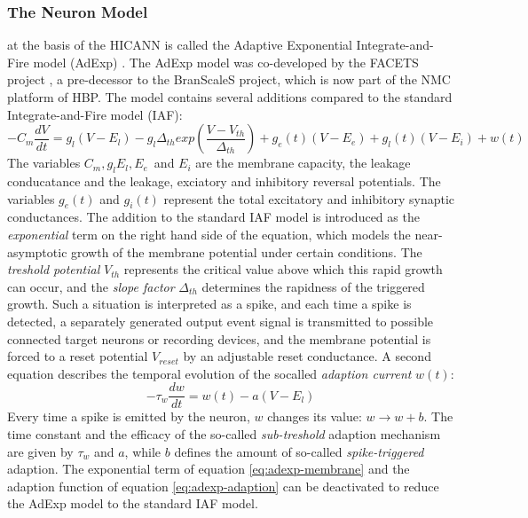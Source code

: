 \subsubsection{The Neuron Model}\label{sect:adexp} at the basis of the HICANN is called the Adaptive Exponential Integrate-and-Fire model (AdExp) \cite{brette_adaptive_2005}.
The AdExp model was co-developed by the FACETS project \cite{schemmel_wafer-scale_2010}, a pre-decessor to the BranScaleS project, which is now part of the NMC platform of HBP.
The model contains several additions compared to the standard Integrate-and-Fire model (IAF):
\begin{equation}\label{eq:adexp-membrane}
-C_m\frac{dV}{dt} = g_l(V-E_l) - g_l\Delta_{th}exp(\frac{V-V_{th}}{\Delta_{th}}) + g_e(t)(V-E_e)+g_l(t)(V-E_i)+w(t)
\end{equation}
The variables $C_m, g_l E_l, E_e$ and $E_i$ are the membrane capacity, the leakage conducatance and the leakage, exciatory and inhibitory reversal potentials.
The variables $g_e(t)$ and $g_i(t)$ represent the total excitatory and inhibitory synaptic conductances.
The addition to the standard IAF model is introduced as the \textit{exponential} term on the right hand side of the equation, which models the near-asymptotic growth of the membrane potential under certain conditions.
The \textit{treshold potential} $V_{th}$ represents the critical value above which this rapid growth can occur, and the \textit{slope factor} $\Delta_{th}$ determines the rapidness of the triggered growth.
Such a situation is interpreted as a spike, and each time a spike is detected, a separately generated output event signal is transmitted to possible connected target neurons or recording devices, and the membrane potential is forced to a reset potential $V_{reset}$ by an adjustable reset conductance.
A second equation describes the temporal evolution of the socalled \textit{adaption current} $w(t)$:
\begin{equation}\label{eq:adexp-adaption}
-\tau_{w}\frac{dw}{dt} = w(t) - a(V-E_l)
\end{equation}
Every time a spike is emitted by the neuron, $w$ changes its value: $w \rightarrow w + b$.
The time constant and the efficacy of the so-called \textit{sub-treshold} adaption mechanism are given by $\tau_w$ and $a$, while $b$ defines the amount of so-called \textit{spike-triggered} adaption.
The exponential term of equation \ref{eq:adexp-membrane} and the adaption function of equation \ref{eq:adexp-adaption} can be deactivated to reduce the AdExp model to the standard IAF model.
\cite{schemmel_wafer-scale_2010}\cite{brette_adaptive_2005}

